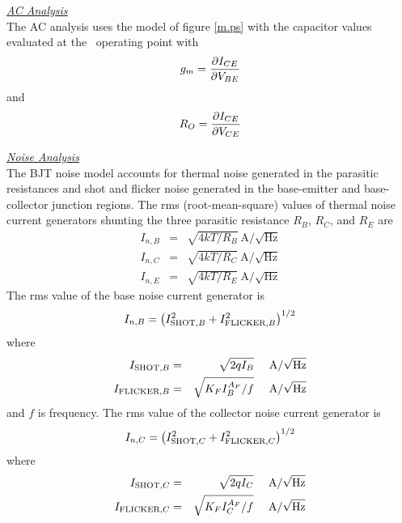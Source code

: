 \noindent\underline{\sl \large AC Analysis}\\[0.1in]
The AC analysis uses the model of figure  \ref{m.ps} with the capacitor values
evaluated at the \dc\ operating point with
\begin{equation}
g_m = {{\textstyle\partial I_{CE}} \over {\textstyle\partial V_{BE}}}
\end{equation}
and
\begin{equation}
R_{O} = {{\textstyle\partial I_{CE}} \over {\textstyle\partial V_{CE}}}
\end{equation}

\clearpage
\noindent\underline{\sl \large Noise Analysis}\\[0.1in]
The BJT noise model accounts for thermal noise generated in the
parasitic resistances and shot and flicker noise generated in the
base-emitter and base-collector junction regions.
The rms (root-mean-square) values of
thermal noise current generators shunting the three parasitic resistance
$R_B$, $R_C$, and $R_E$ are
\begin{eqnarray}
I_{n,B} &=& \sqrt{4kT/R_B}~\mbox{A/}\sqrt{\mbox{Hz}}\\
I_{n,C} &=& \sqrt{4kT/R_C}~\mbox{A/}\sqrt{\mbox{Hz}}\\
I_{n,E} &=& \sqrt{4kT/R_E}~\mbox{A/}\sqrt{\mbox{Hz}}
\end{eqnarray}
The rms value of the base noise current generator is
\begin{equation}
I_{n,B} = \left( I_{\mbox{\scriptsize SHOT},B}^2 + I_{\mbox{\scriptsize FLICKER},B}^2
                \right)^{1/2}
\end{equation}
where
\begin{eqnarray}
I_{\mbox{\scriptsize SHOT},B} &=& \sqrt{2qI_B} ~~~~\mbox{A/}\sqrt{\mbox{Hz}}\\
I_{\mbox{\scriptsize FLICKER},B} &=& \sqrt{K_F I_{B}^{A_F} /f } ~~~~\mbox{A/}\sqrt{\mbox{Hz}}
\end{eqnarray}
and $f$ is frequency.
The rms value of the collector noise current generator is
\begin{equation}
I_{n,C} = \left( I_{\mbox{\scriptsize SHOT},C}^2 + I_{\mbox{\scriptsize FLICKER},C}^2
                \right)^{1/2}
\end{equation}
where
\begin{eqnarray}
I_{\mbox{\scriptsize SHOT},C} &=& \sqrt{2qI_C} ~~~~\mbox{A/}\sqrt{\mbox{Hz}}\\
I_{\mbox{\scriptsize FLICKER},C} &=& \sqrt{K_F I_C^{A_F} /f } ~~~~\mbox{A/}\sqrt{\mbox{Hz}}
\end{eqnarray}

